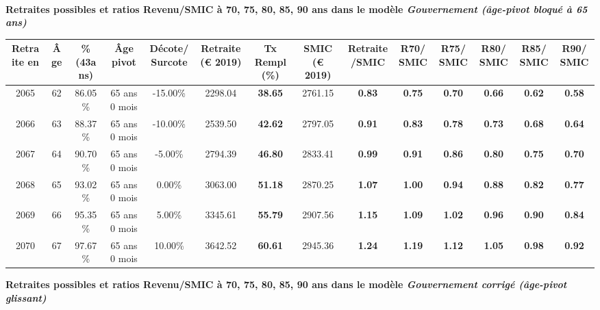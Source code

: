  ~\\{\bf \noindent Retraites possibles et ratios Revenu/SMIC à 70, 75, 80, 85, 90 ans dans le modèle \emph{Gouvernement (âge-pivot bloqué à 65 ans)}}  
 
\begin{adjustbox}{max width=\textwidth} 
\begin{tabular}[htb]{|c|c||c|c|c||c|c||c|c||c|c|c|c|c|} 
\hline 
 Retraite en &  Âge &  \%(43ans) &  Âge pivot &  Décote/Surcote &  Retraite (\euro{} 2019) &  Tx Rempl(\%) &  SMIC (\euro{} 2019) &  Retraite/SMIC &  R70/SMIC &  R75/SMIC &  R80/SMIC &  R85/SMIC &  R90/SMIC \\ 
\hline \hline 
 2065 &  62 &  86.05\% &  65 ans 0 mois &  -15.00\% &  2298.04 &  {\bf 38.65} &  2761.15 &  {\bf {\color{red} 0.83}} &  {\bf {\color{red} 0.75}} &  {\bf {\color{red} 0.70}} &  {\bf {\color{red} 0.66}} &  {\bf {\color{red} 0.62}} &  {\bf {\color{red} 0.58}} \\ 
\hline 
 2066 &  63 &  88.37\% &  65 ans 0 mois &  -10.00\% &  2539.50 &  {\bf 42.62} &  2797.05 &  {\bf {\color{red} 0.91}} &  {\bf {\color{red} 0.83}} &  {\bf {\color{red} 0.78}} &  {\bf {\color{red} 0.73}} &  {\bf {\color{red} 0.68}} &  {\bf {\color{red} 0.64}} \\ 
\hline 
 2067 &  64 &  90.70\% &  65 ans 0 mois &  -5.00\% &  2794.39 &  {\bf 46.80} &  2833.41 &  {\bf {\color{red} 0.99}} &  {\bf {\color{red} 0.91}} &  {\bf {\color{red} 0.86}} &  {\bf {\color{red} 0.80}} &  {\bf {\color{red} 0.75}} &  {\bf {\color{red} 0.70}} \\ 
\hline 
 2068 &  65 &  93.02\% &  65 ans 0 mois &  0.00\% &  3063.00 &  {\bf 51.18} &  2870.25 &  {\bf 1.07} &  {\bf 1.00} &  {\bf {\color{red} 0.94}} &  {\bf {\color{red} 0.88}} &  {\bf {\color{red} 0.82}} &  {\bf {\color{red} 0.77}} \\ 
\hline 
 2069 &  66 &  95.35\% &  65 ans 0 mois &  5.00\% &  3345.61 &  {\bf 55.79} &  2907.56 &  {\bf 1.15} &  {\bf 1.09} &  {\bf 1.02} &  {\bf {\color{red} 0.96}} &  {\bf {\color{red} 0.90}} &  {\bf {\color{red} 0.84}} \\ 
\hline 
 2070 &  67 &  97.67\% &  65 ans 0 mois &  10.00\% &  3642.52 &  {\bf 60.61} &  2945.36 &  {\bf 1.24} &  {\bf 1.19} &  {\bf 1.12} &  {\bf 1.05} &  {\bf {\color{red} 0.98}} &  {\bf {\color{red} 0.92}} \\ 
\hline 
\hline 
\end{tabular} 
\end{adjustbox} 
 
 \vspace{0.1cm} 
{\bf \noindent Retraites possibles et ratios Revenu/SMIC à 70, 75, 80, 85, 90 ans dans le modèle \emph{Gouvernement corrigé (âge-pivot glissant)}}  
 
